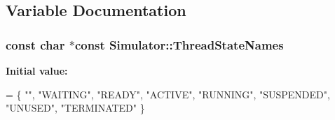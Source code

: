 \subsection{Variable Documentation}
\hypertarget{namespace_simulator_ac83869ddbe91d60b829877113e17acb0}{
\subsubsection[{Thread\+State\+Names}]{\setlength{\rightskip}{0pt plus 5cm}const char $\ast$const Simulator\+::\+Thread\+State\+Names}}\label{namespace_simulator_ac83869ddbe91d60b829877113e17acb0}
{\bfseries Initial value\+:}
\begin{DoxyCode}
= \{
    \textcolor{stringliteral}{""}, \textcolor{stringliteral}{"WAITING"}, \textcolor{stringliteral}{"READY"}, \textcolor{stringliteral}{"ACTIVE"}, \textcolor{stringliteral}{"RUNNING"}, \textcolor{stringliteral}{"SUSPENDED"}, \textcolor{stringliteral}{"UNUSED"}, \textcolor{stringliteral}{"TERMINATED"}
\}
\end{DoxyCode}
